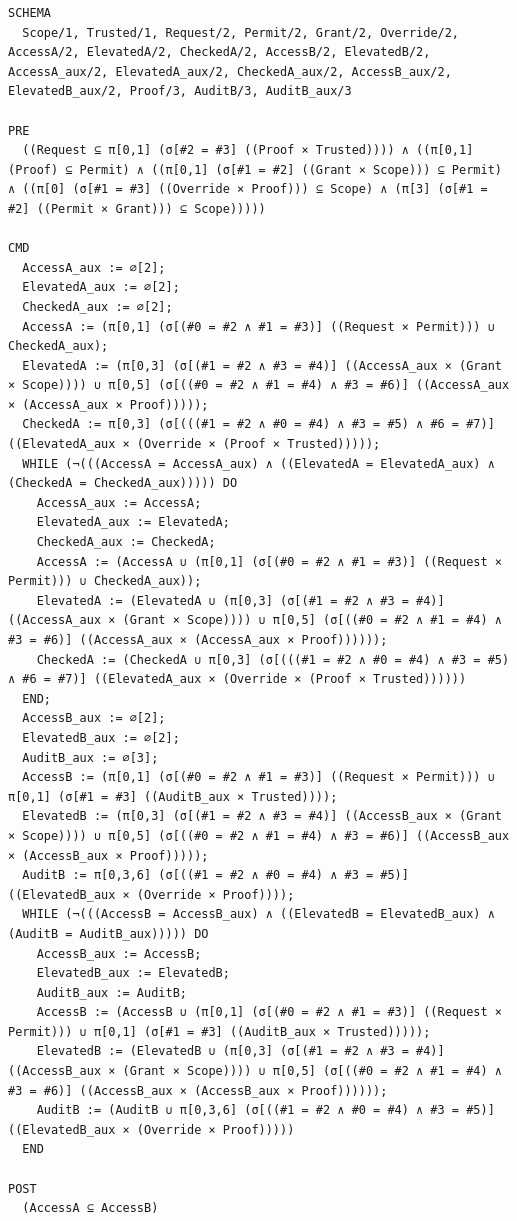 \documentclass[10pt]{article}
\begin{document}
\begin{Verbatim}[fontsize=\tiny,breaklines=true,breakanywhere=true,frame=single,framesep=1.5mm]
SCHEMA
  Scope/1, Trusted/1, Request/2, Permit/2, Grant/2, Override/2, AccessA/2, ElevatedA/2, CheckedA/2, AccessB/2, ElevatedB/2, AccessA_aux/2, ElevatedA_aux/2, CheckedA_aux/2, AccessB_aux/2, ElevatedB_aux/2, Proof/3, AuditB/3, AuditB_aux/3

PRE
  ((Request ⊆ π[0,1] (σ[#2 = #3] ((Proof × Trusted)))) ∧ ((π[0,1] (Proof) ⊆ Permit) ∧ ((π[0,1] (σ[#1 = #2] ((Grant × Scope))) ⊆ Permit) ∧ ((π[0] (σ[#1 = #3] ((Override × Proof))) ⊆ Scope) ∧ (π[3] (σ[#1 = #2] ((Permit × Grant))) ⊆ Scope)))))

CMD
  AccessA_aux := ∅[2];
  ElevatedA_aux := ∅[2];
  CheckedA_aux := ∅[2];
  AccessA := (π[0,1] (σ[(#0 = #2 ∧ #1 = #3)] ((Request × Permit))) ∪ CheckedA_aux);
  ElevatedA := (π[0,3] (σ[(#1 = #2 ∧ #3 = #4)] ((AccessA_aux × (Grant × Scope)))) ∪ π[0,5] (σ[((#0 = #2 ∧ #1 = #4) ∧ #3 = #6)] ((AccessA_aux × (AccessA_aux × Proof)))));
  CheckedA := π[0,3] (σ[(((#1 = #2 ∧ #0 = #4) ∧ #3 = #5) ∧ #6 = #7)] ((ElevatedA_aux × (Override × (Proof × Trusted)))));
  WHILE (¬(((AccessA = AccessA_aux) ∧ ((ElevatedA = ElevatedA_aux) ∧ (CheckedA = CheckedA_aux))))) DO
    AccessA_aux := AccessA;
    ElevatedA_aux := ElevatedA;
    CheckedA_aux := CheckedA;
    AccessA := (AccessA ∪ (π[0,1] (σ[(#0 = #2 ∧ #1 = #3)] ((Request × Permit))) ∪ CheckedA_aux));
    ElevatedA := (ElevatedA ∪ (π[0,3] (σ[(#1 = #2 ∧ #3 = #4)] ((AccessA_aux × (Grant × Scope)))) ∪ π[0,5] (σ[((#0 = #2 ∧ #1 = #4) ∧ #3 = #6)] ((AccessA_aux × (AccessA_aux × Proof))))));
    CheckedA := (CheckedA ∪ π[0,3] (σ[(((#1 = #2 ∧ #0 = #4) ∧ #3 = #5) ∧ #6 = #7)] ((ElevatedA_aux × (Override × (Proof × Trusted))))))
  END;
  AccessB_aux := ∅[2];
  ElevatedB_aux := ∅[2];
  AuditB_aux := ∅[3];
  AccessB := (π[0,1] (σ[(#0 = #2 ∧ #1 = #3)] ((Request × Permit))) ∪ π[0,1] (σ[#1 = #3] ((AuditB_aux × Trusted))));
  ElevatedB := (π[0,3] (σ[(#1 = #2 ∧ #3 = #4)] ((AccessB_aux × (Grant × Scope)))) ∪ π[0,5] (σ[((#0 = #2 ∧ #1 = #4) ∧ #3 = #6)] ((AccessB_aux × (AccessB_aux × Proof)))));
  AuditB := π[0,3,6] (σ[((#1 = #2 ∧ #0 = #4) ∧ #3 = #5)] ((ElevatedB_aux × (Override × Proof))));
  WHILE (¬(((AccessB = AccessB_aux) ∧ ((ElevatedB = ElevatedB_aux) ∧ (AuditB = AuditB_aux))))) DO
    AccessB_aux := AccessB;
    ElevatedB_aux := ElevatedB;
    AuditB_aux := AuditB;
    AccessB := (AccessB ∪ (π[0,1] (σ[(#0 = #2 ∧ #1 = #3)] ((Request × Permit))) ∪ π[0,1] (σ[#1 = #3] ((AuditB_aux × Trusted)))));
    ElevatedB := (ElevatedB ∪ (π[0,3] (σ[(#1 = #2 ∧ #3 = #4)] ((AccessB_aux × (Grant × Scope)))) ∪ π[0,5] (σ[((#0 = #2 ∧ #1 = #4) ∧ #3 = #6)] ((AccessB_aux × (AccessB_aux × Proof))))));
    AuditB := (AuditB ∪ π[0,3,6] (σ[((#1 = #2 ∧ #0 = #4) ∧ #3 = #5)] ((ElevatedB_aux × (Override × Proof)))))
  END

POST
  (AccessA ⊆ AccessB)
\end{Verbatim}
\end{document}
